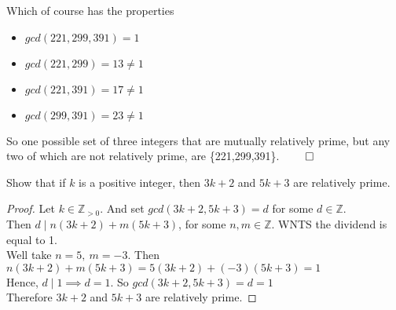 \documentclass[12pt]{article}
\newcommand{\Z}{\mathbb{Z}}
\newenvironment{exercise}[2][Exercise]{\begin{trivlist}
\item[\hskip \labelsep {\bfseries #1}\hskip \labelsep {\bfseries #2.}]}{\end{trivlist}}
\begin{document}
\begin{center}
\end{center}

Which of course has the properties
\begin{itemize}
\item $gcd(221,299,391)=1$
\item $gcd(221,299)=13\neq1$
\item $gcd(221,391)=17\neq1$
\item $gcd(299,391)=23\neq1$
\end{itemize}

So one possible set of three integers that are mutually relatively prime, but any two of which are not relatively prime, are \{221,299,391\}. $\qed$





\renewcommand\qedsymbol{$q.e.d.$} 
\begin{exercise}{3.3.24} Show that if $k$ is a positive integer, then $3k+2$ and $5k+3$ are relatively prime.
\end{exercise}
\begin{proof}
Let $k\in \Z_{>0}$. And set $gcd(3k+2,5k+3)=d$ for some $d\in\Z$.\\
Then $d\mid n(3k+2)+m(5k+3)$, for some $n,m\in\Z$. WNTS the dividend is equal to 1.\\
Well take $n=5,~m=-3$. Then \\
$n(3k+2)+m(5k+3)=5(3k+2)+(-3)(5k+3)=1$\\
Hence, $d\mid 1 \implies d=1$. So $gcd(3k+2,5k+3)=d=1$\\

\noindent Therefore $3k+2$ and $5k+3$ are relatively prime.
\end{proof}
\end{document}
